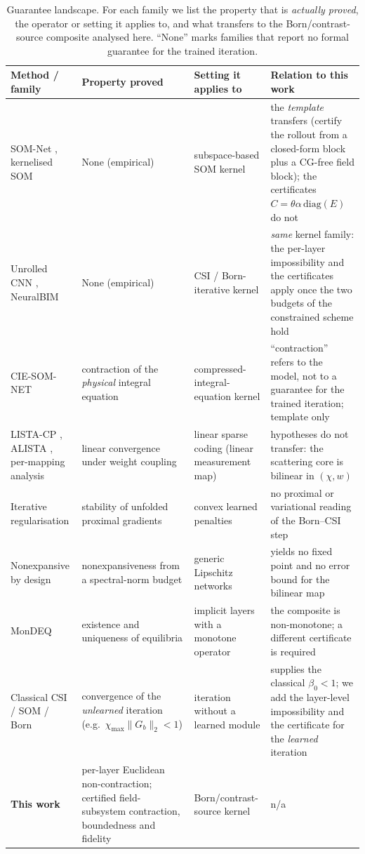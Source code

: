 \documentclass[journal,cmes,article,submit,moreauthors,pdftex]{Definitions/tsp}
\newcommand{\norm}[1]{\lVert #1 \rVert}
\begin{document}
\begin{table}[htbp]
\centering
\caption{Guarantee landscape. For each family we list the property that is
\emph{actually proved}, the operator or setting it applies to, and what transfers to the
Born/contrast-source composite analysed here. ``None'' marks families that report no
formal guarantee for the trained iteration.}
\label{tab:guarantees}
\small\setlength{\emergencystretch}{1.5em}\hfuzz=0.75pt
\renewcommand{\arraystretch}{1.2}
\begin{tabular}{@{}p{}p{}p{}p{}@{}}
\toprule
Method / family & Property proved & Setting it applies to & Relation to this work \\
\midrule
SOM-Net \cite{somnet}, kernelised SOM \cite{kernelunroll} & None (empirical) &
subspace-based SOM kernel & the \emph{template} transfers (certify the rollout from a
closed-form block plus a CG-free field block); the certificates
$C=\theta\alpha\,\mathrm{diag}(E)$ do not \\
Unrolled CNN \cite{unrolledcnn}, NeuralBIM \cite{neuralbim,mfneuralbim} & None (empirical) &
CSI / Born-iterative kernel & \emph{same} kernel family: the per-layer impossibility and
the certificates apply once the two budgets of the constrained scheme hold \\
CIE-SOM-NET \cite{ciesomnet} & contraction of the \emph{physical} integral equation &
compressed-integral-equation kernel & ``contraction'' refers to the model, not to a
guarantee for the trained iteration; template only \\
LISTA-CP \cite{listacp}, ALISTA \cite{alista}, per-mapping analysis \cite{algomapping} &
linear convergence under weight coupling & linear sparse coding (linear measurement map) &
hypotheses do not transfer: the scattering core is bilinear in $(\chi,w)$ \\
Iterative regularisation \cite{cui_reg} & stability of unfolded proximal gradients &
convex learned penalties & no proximal or variational reading of the Born--CSI step \\
Nonexpansive by design \cite{sherry_nonexp} & nonexpansiveness from a spectral-norm budget &
generic Lipschitz networks & yields no fixed point and no error bound for the bilinear map \\
MonDEQ \cite{mondeq} & existence and uniqueness of equilibria & implicit layers with a
monotone operator & the composite is non-monotone; a different certificate is required \\
Classical CSI / SOM / Born \cite{csi_lit,som_lit,born_lit,convergentborn} &
convergence of the \emph{unlearned} iteration (e.g.\ $\chi_{\max}\norm{G_b}_2<1$) &
iteration without a learned module & supplies the classical $\beta_0<1$; we add the
layer-level impossibility and the certificate for the \emph{learned} iteration \\
\textbf{This work} & per-layer Euclidean non-contraction; certified field-subsystem
contraction, boundedness and fidelity & Born/contrast-source kernel & n/a \\
\bottomrule
\end{tabular}
\end{table}
\end{document}
